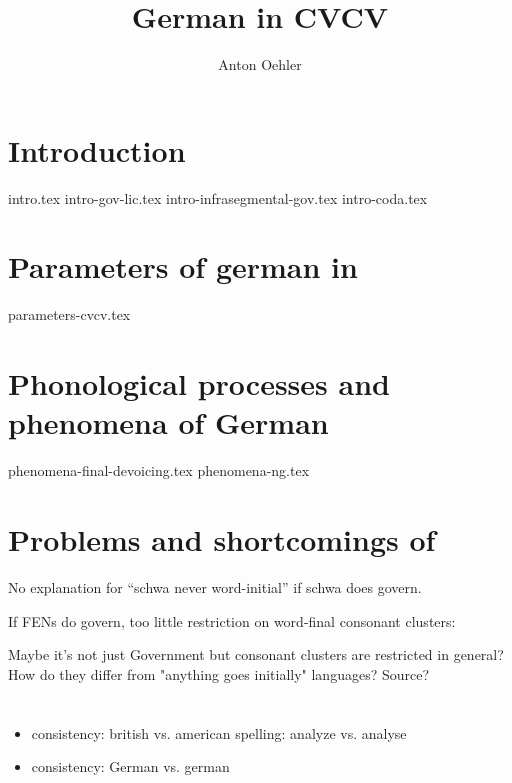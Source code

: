 \documentclass[
]{scrartcl}
\title{German in CVCV}
\author{Anton Oehler}
\begin{document}
\maketitle


\tableofcontents

\section{Introduction}
{intro.tex}
{intro-gov-lic.tex}
{intro-infrasegmental-gov.tex}
{intro-coda.tex}


\section{Parameters of german in \CVCV}
{parameters-cvcv.tex}


\section{Phonological processes and phenomena of German}
{phenomena-final-devoicing.tex}
{phenomena-ng.tex}

\section{Problems and shortcomings of \CVCV}
No explanation for \enquote{schwa never word-initial} if schwa does govern.

If \glspl{FEN} do govern, too little restriction on word-final consonant
clusters:

\ti{*[Sa:fk]}
\begin{structure}
  \wordstart
  \emptyV
  \fen
\end{structure}

Maybe it's not just Government but consonant clusters are restricted
in general? How do they differ from "anything goes initially" languages?
Source?

\section*{\TODO{}}
\begin{itemize}
\item consistency: british vs. american spelling: analyze vs. analyse
\item consistency: German vs. german
\end{itemize}

\printbibliography
\end{document}
